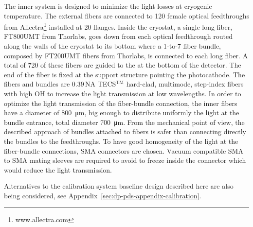 
The inner system is designed to minimize the light losses at cryogenic temperature. The external fibers are connected to 120 female optical feedthroughs from Allectra\footnote{www.allectra.com} installed at \num{20} flanges. Inside the cryostat, a single long fiber, FT800UMT from Thorlabs, goes down from each optical feedthrough routed along the walls of the cryostat to its bottom where a \num{1}-to-\num{7} fiber bundle, composed by FT200UMT fibers from Thorlabs, is connected to each long fiber. A total of \num{720} of these fibers are guided to the  at the bottom of the detector. The end of the fiber is fixed at the  support structure pointing the photocathode. The fibers and bundles are \num{0.39}\,NA TECS$^\text{TM}$ hard-clad, multimode, step-index fibers with high OH to increase the light transmission at low wavelengths. In order to optimize the light transmission of the fiber-bundle connection, the inner fibers have a diameter of \SI{800}{\um}, big enough to distribute uniformly the light at the bundle entrance, total diameter \SI{700}{\um}. From the mechanical point of view, the described approach of bundles attached to fibers is safer than connecting directly the bundles to the feedthroughs. To have good homogeneity of the light at the fiber-bundle connections, SMA connectors are chosen. Vacuum compatible SMA to SMA mating sleeves are required to avoid  to freeze inside the connector which would reduce the light transmission.

Alternatives to the calibration system baseline design described here are also being considered, see Appendix~\ref{sec:dp-pds-appendix-calibration}. 



